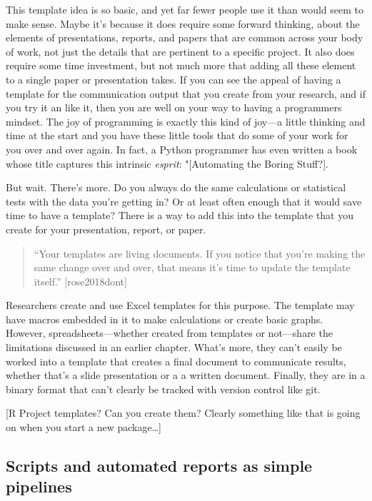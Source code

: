 \documentclass[]{tufte-book}
\begin{document}
This template idea is so basic, and yet far fewer people use it than would seem
to make sense. Maybe it's because it does require some forward thinking, about
the elements of presentations, reports, and papers that are common across your
body of work, not just the details that are pertinent to a specific project. It
also does require some time investment, but not much more that adding all these
element to a single paper or presentation takes. If you can see the appeal of
having a template for the communication output that you create from your
research, and if you try it an like it, then you are well on your way to having
a programmers mindset. The joy of programming is exactly this kind of joy---a
little thinking and time at the start and you have these little tools that do
some of your work for you over and over again. In fact, a Python programmer has
even written a book whose title captures this intrinsic \emph{esprit}: "{[}Automating
the Boring Stuff?{]}.

But wait. There's more. Do you always do the same calculations or statistical
tests with the data you're getting in? Or at least often enough that it would
save time to have a template? There is a way to add this into the template that
you create for your presentation, report, or paper.

\begin{quote}
``Your templates are living documents. If you notice that you're making the same
change over and over, that means it's time to update the template itself.''
{[}rose2018dont{]}
\end{quote}

Researchers create and use Excel templates for this purpose. The template
may have macros embedded in it to make calculations or create basic graphs.
However, spreadsheets---whether created from templates or not---share
the limitations discussed in an earlier chapter. What's more, they can't
easily be worked into a template that creates a final document to
communicate results, whether that's a slide presentation or a
a written document. Finally, they are in a binary format that can't
clearly be tracked with version control like git.

{[}R Project templates? Can you create them? Clearly something like that is
going on when you start a new package\ldots{]}

\hypertarget{scripts-and-automated-reports-as-simple-pipelines}{%
\subsection{Scripts and automated reports as simple pipelines}\label{scripts-and-automated-reports-as-simple-pipelines}}
\end{document}
